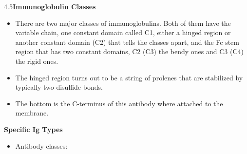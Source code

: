 \documentclass[UTF8]{book}
\begin{document}
4.5\quad \textbf{Immunoglobulin Classes}
\begin{itemize}
\item There are two major classes of immunoglobulins. Both of them have the variable chain, one constant domain called C1, either a hinged region or another constant domain (C2) that tells the classes apart, and the Fc stem region that has two constant domains, C2 (C3) the bendy ones and C3 (C4) the rigid ones.
\item The hinged region turns out to be a string of prolenes that are stabilized by typically two disulfide bonds.
\item The bottom is the C-terminus of this antibody where attached to the membrane.
\end{itemize}
\quad \textbf{Specific Ig Types}
\begin{itemize}
\item Antibody classes:


\end{itemize}
\end{document}
